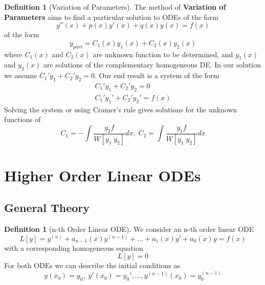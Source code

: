 \documentclass[12pt]{article}
\theoremstyle{definition}
\newtheorem{defn}[thm]{Definition}
\theoremstyle{remark}
\numberwithin{equation}{section}
\newcommand\B[1]{\textbf{ #1}}
\begin{document}
\begin{defn}[Variation of Parameters]
        The method of \B{Variation of Parameters} aims to find a particular solution to ODEs of the form \begin{equation}
                y''(x) + p(x)y'(x) + q(x)y(x) = f(x)
        \end{equation} 
        of the form \begin{equation}
                y_{part} = C_1(x)y_1(x) + C_2(x)y_2(x)
        \end{equation}
        where $C_1(x)$ and $C_2(x)$ are unknown function to be determined, and $y_1(x)$ and $y_2(x)$ are solutions of the complementary homogeneous DE. In our solution we assume $C_1'y_1 + C_2'y_2 = 0$. Our end result is a system of the form \begin{equation}
                \begin{matrix} C_1'y_1 + C_2'y_2 =0 \\ C_1'y_1' + C_2'y_2' = f(x) \end{matrix}
        \end{equation}
        Solving the system or using Cramer's rule gives solutions for the unknown functions of \begin{equation}
                C_1 = -\int\frac{y_2f}{W[y_1\;y_2]}dx,\;C_2 = \int\frac{y_1f}{W[y_1\;y_2]}dx
        \end{equation}
\end{defn}





\section{Higher Order Linear ODEs}


\subsection{General Theory}

\begin{defn}[n-th Order Linear ODE]
        We consider an n-th order linear ODE \begin{equation}
                L[y]=y^{(n)}+a_{n-1}(x)y^{(n-1)}+\hdots +a_1(x)y'+a_0(x)y =f(x)
        \end{equation}
        with a corresponding homogeneous equation \begin{equation}
                L[y] = 0
        \end{equation}
        For both ODEs we can describe the initial conditions as \begin{equation}
                y(x_0) = y_0,\;y'(x_0) = y_0',...,y^{(n-1)}(x_0)=y_0^{(n-1)}
        \end{equation}
\end{defn}
\end{document}
